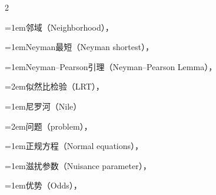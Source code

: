 \begin{multicols}{2}
\par\addvspace{2pt}
\par\noindent\hangindent=1em\hspace*{0em}\label{idx:720}邻域（Neighborhood），\hyperref[def:2.3.6]{\pageref*{def:2.3.6}}\par
\par\addvspace{2pt}
\par\noindent\hangindent=1em\hspace*{0em}\label{idx:721}Neyman最短（Neyman shortest），\hyperref[idxocc:721:392]{\pageref*{idxocc:721:392}}\par
\par\addvspace{2pt}
\par\noindent\hangindent=1em\hspace*{0em}\label{idx:722}Neyman–Pearson引理（Neyman–Pearson Lemma），\hyperref[thm:8.3.12]{\pageref*{thm:8.3.12}}\par
\par\noindent\hangindent=2em\hspace*{1em}\label{idx:723}似然比检验（LRT），\hyperref[exercise:8.24]{\pageref*{exercise:8.24}}\par
\par\addvspace{2pt}
\par\noindent\hangindent=1em\hspace*{0em}\label{idx:724}尼罗河（Nile）\par
\par\noindent\hangindent=2em\hspace*{1em}\label{idx:725}问题（problem），\hyperref[exercise:6.37]{\pageref*{exercise:6.37}}\par
\par\addvspace{2pt}
\par\noindent\hangindent=1em\hspace*{0em}\label{idx:726}正规方程（Normal equations），\hyperref[exercise:11.25]{\pageref*{exercise:11.25}}\par
\par\addvspace{2pt}
\par\noindent\hangindent=1em\hspace*{0em}\label{idx:727}滋扰参数（Nuisance parameter），\hyperref[idxocc:727:337]{\pageref*{idxocc:727:337}}\par
\par\addvspace{2pt}
\par\noindent\hangindent=1em\hspace*{0em}\label{idx:728}优势（Odds），\hyperref[idxocc:728:414]{\pageref*{idxocc:728:414}}\par

\end{multicols}
